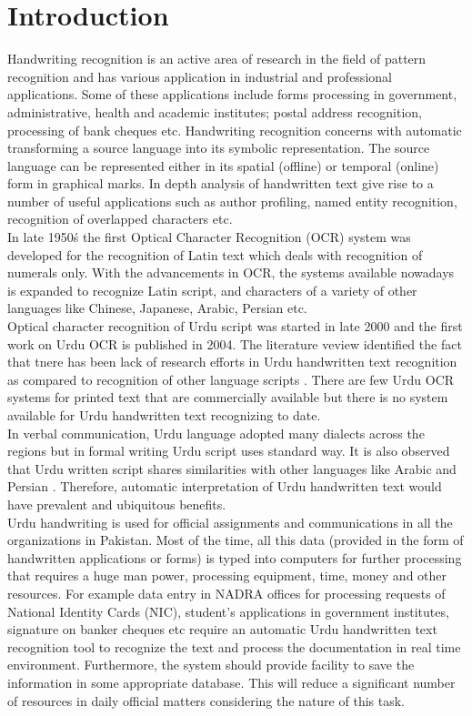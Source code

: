 \documentclass[a4paper,conference]{IEEEtran}
\begin{document}
\section{Introduction}
Handwriting recognition is an active area of research in the field of pattern recognition and has various application in industrial and professional applications. Some of these applications include forms processing in government, administrative, health and academic institutes; postal address recognition, processing of bank cheques etc. Handwriting recognition concerns with automatic transforming a source language into its symbolic representation. The source language can be represented either in its spatial (offline) or temporal (online) \cite{61} form in graphical marks. In depth analysis of handwritten text give rise to a number of useful applications such as author profiling, named entity recognition, recognition of overlapped characters etc.\\
In late 1950\'s the first Optical Character Recognition (OCR) system was developed for the recognition of Latin text \cite{62, 63} which deals with recognition of numerals only. With the advancements in OCR, the systems available nowadays is expanded to recognize Latin script, and characters of a variety of other languages like Chinese, Japanese, Arabic, Persian etc.\\
Optical character recognition of Urdu script was started in late 2000 \cite{7} and the first work on Urdu OCR is published in 2004. The literature veview identified the fact that tnere has been lack of research efforts in Urdu handwritten text recognition as compared to recognition of other language scripts \cite{5, 7, 27}. There are few Urdu OCR systems for printed text that are commercially available \cite{64, 65} but there is no system available for Urdu handwritten text recognizing to date.\\
In verbal communication, Urdu language adopted many dialects across the regions but in formal writing Urdu script uses standard way. It is also observed that Urdu written script shares similarities with other languages like Arabic and Persian \cite{21}. Therefore, automatic interpretation of Urdu handwritten text would have prevalent and ubiquitous benefits.\\
Urdu handwriting is used for official assignments and communications in all the organizations in Pakistan. Most of the time, all this data (provided in the form of handwritten applications or forms) is typed into computers for further processing that requires a huge man power, processing equipment, time, money and other resources. For example data entry in NADRA offices for processing requests of National Identity Cards (NIC), student’s applications in government institutes, signature on banker cheques etc require an automatic Urdu handwritten text recognition tool to recognize the text and process the documentation in real time environment. Furthermore, the system should provide facility to save the information in some appropriate database. This will reduce a significant number of resources in daily official matters considering the nature of this task.\\
\end{document}
